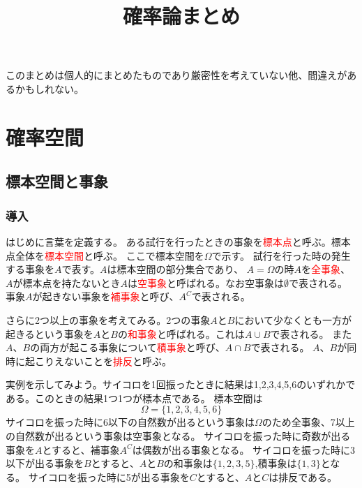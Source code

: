 \documentclass[a4paper,10pt]{jarticle}
\begin{document}
\title{確率論まとめ}
\date{}
\maketitle
このまとめは個人的にまとめたものであり厳密性を考えていない他、間違えがあるかもしれない。
\section{確率空間}
\subsection{標本空間と事象}
\subsubsection{導入}
はじめに言葉を定義する。
ある試行を行ったときの事象を\textcolor{red}{標本点}と呼ぶ。標本点全体を\textcolor{red}{標本空間}と呼ぶ。
ここで標本空間を$\Omega$で示す。
試行を行った時の発生する事象を$A$で表す。$A$は標本空間の部分集合であり、
$A=\Omega$の時$A$を\textcolor{red}{全事象}、$A$が標本点を持たないとき$A$は\textcolor{red}{空事象}と呼ばれる。なお空事象は$\emptyset$で表される。
事象$A$が起きない事象を\textcolor{red}{補事象}と呼び、$A^C$で表される。

さらに2つ以上の事象を考えてみる。2つの事象$A$と$B$において少なくとも一方が起きるという事象を$A$と$B$の\textcolor{red}{和事象}と呼ばれる。これは$A\cup B$で表される。
また$A$、$B$の両方が起こる事象について\textcolor{red}{積事象}と呼び、$A\cap B$で表される。
$A$、$B$が同時に起こりえないことを\textcolor{red}{排反}と呼ぶ。

実例を示してみよう。サイコロを1回振ったときに結果は1,2,3,4,5,6のいずれかである。このときの結果1つ1つが標本点である。
標本空間は
\begin{equation}
    \Omega = \{1,2,3,4,5,6\}\tag{1,1}
\end{equation}
サイコロを振った時に6以下の自然数が出るという事象は$\Omega$のため全事象、7以上の自然数が出るという事象は空事象となる。
サイコロを振った時に奇数が出る事象を$A$とすると、補事象$A^C$は偶数が出る事象となる。
サイコロを振った時に3以下が出る事象を$B$とすると、$A$と$B$の和事象は$\{1,2,3,5\}$,積事象は$\{1,3\}$となる。
サイコロを振った時に5が出る事象を$C$とすると、$A$と$C$は排反である。
\end{document}

